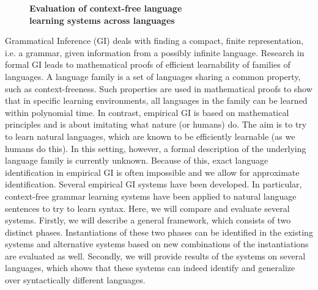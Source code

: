 \documentclass[10pt, a4paper, twopage, headinclude, footinclude, BCOR5mm]{book}
\begin{document}
\newpage

\begin{figure}[t!]
\centering
\large\textbf{Evaluation of context-free language \\ learning systems across languages}
\vspace*{0.5cm}
\end{figure}


\begin{table}[t!]
\end{table} 
\noindent
Grammatical Inference (GI) deals with finding a compact, finite representation, i.e. a grammar, given information from a possibly infinite language.  Research in formal GI leads to mathematical proofs of efficient learnability of families of languages.  A language family is a set of languages sharing a common property, such as context-freeness.  Such properties are used in mathematical proofs to show that in specific learning environments, all languages in the family can be learned within polynomial time.  In contrast, empirical GI is based on mathematical principles and is about imitating what nature (or humans) do.  The aim is to try to learn natural languages, which are known to be efficiently learnable (as we humans do this).  In this setting, however, a formal description of the underlying language family is currently unknown. Because of this, exact language identification in empirical GI is often impossible and we allow for approximate identification.  Several empirical GI systems have been developed.  In particular, context-free grammar learning systems have been applied to natural language sentences to try to learn syntax.  Here, we will compare and evaluate several systems.  Firstly, we will describe a general framework, which consists of two distinct phases.  Instantiations of these two phases can be identified in the existing systems and alternative systems based on new combinations of the instantiations are evaluated as well.  Secondly, we will provide results of the systems on several languages, which shows that these systems can indeed identify and generalize over syntactically different languages.   
\end{document}

